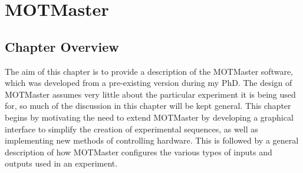 \chapter{MOTMaster}\label{chap:compinterface}

\section{Chapter Overview}\label{sec:compinterface_overview}
The aim of this chapter is to provide a description of the MOTMaster
software, which was developed from a pre-existing version during my PhD. The
design of MOTMaster assumes very little about the particular experiment it is
being used for, so much of the discussion in this chapter will be kept
general. This chapter begins by motivating the need to extend MOTMaster by
developing a graphical interface to simplify the creation of experimental
sequences, as well as implementing new methods of controlling hardware. This
is followed by a general description of how MOTMaster configures the various
types of inputs and outputs used in an experiment. 

